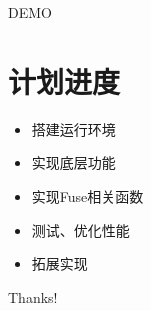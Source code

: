 \documentclass{beamer}
\begin{document}
\begin{frame}
    \begin{center}
        {\Huge DEMO}
    \end{center}
\end{frame}

\section{计划进度}
\begin{frame}
    \begin{itemize}
        \item 搭建运行环境
        \item 实现底层功能
        \item 实现Fuse相关函数
        \item 测试、优化性能
        \item 拓展实现
    \end{itemize}
\end{frame}

\begin{frame}
    \begin{center}
        {\Huge\calligra Thanks!}
    \end{center}
\end{frame}
\end{document}
